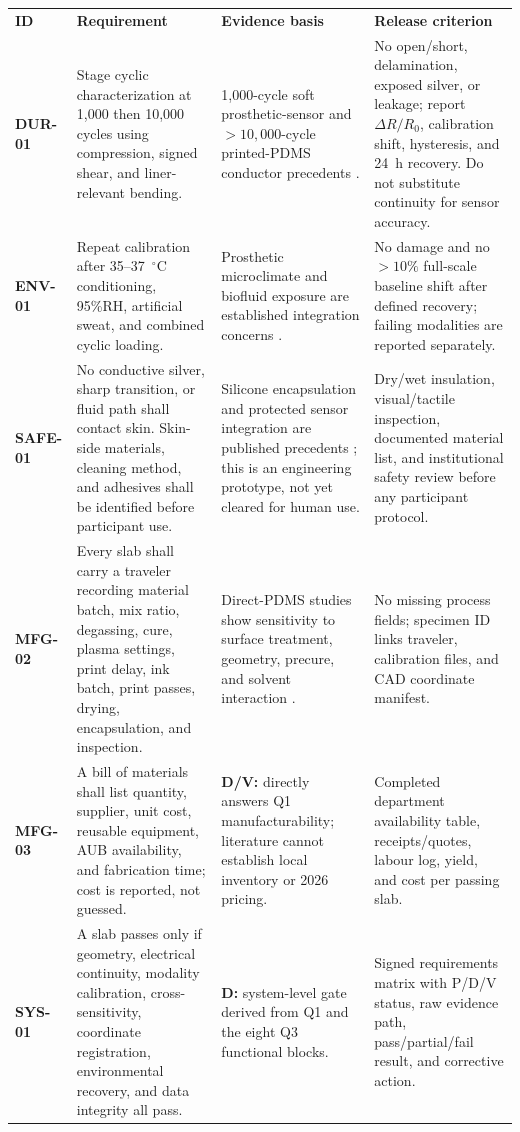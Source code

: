 \vspace{0.25em}
\begingroup
\fontsize{8.0}{9.35}\selectfont
\setlength{\tabcolsep}{3pt}\renewcommand{\arraystretch}{1.06}
\begin{tabularx}{\linewidth}{>{\raggedright\arraybackslash\bfseries\color{AUBRed}}p{1.25cm}Y Y Y}
\color{white}\textbf{ID} & \color{white}\textbf{Requirement} &
\color{white}\textbf{Evidence basis} & \color{white}\textbf{Release criterion} \\
DUR-01 & Stage cyclic characterization at 1,000 then 10,000 cycles using
compression, signed shear, and liner-relevant bending. & 1,000-cycle soft
prosthetic-sensor and $>10{,}000$-cycle printed-PDMS conductor precedents
\cite{q3kwak2020,albrecht2018stretch}. & No open/short, delamination, exposed
silver, or leakage; report $\Delta R/R_0$, calibration shift, hysteresis, and
24~h recovery. Do not substitute continuity for sensor accuracy. \\
ENV-01 & Repeat calibration after 35--37~$^{\circ}$C conditioning, 95\%RH,
artificial sweat, and combined cyclic loading. & Prosthetic microclimate and
biofluid exposure are established integration concerns
\cite{paterno2020,q3kwak2020}. & No damage and no $>10\%$ full-scale baseline
shift after defined recovery; failing modalities are reported separately. \\
SAFE-01 & No conductive silver, sharp transition, or fluid path shall contact
skin. Skin-side materials, cleaning method, and adhesives shall be identified
before participant use. & Silicone encapsulation and protected sensor
integration are published precedents \cite{q3kwak2020,paterno2020}; this is an
engineering prototype, not yet cleared for human use. & Dry/wet insulation,
visual/tactile inspection, documented material list, and institutional safety
review before any participant protocol. \\
MFG-02 & Every slab shall carry a traveler recording material batch, mix ratio,
degassing, cure, plasma settings, print delay, ink batch, print passes, drying,
encapsulation, and inspection. & Direct-PDMS studies show sensitivity to
surface treatment, geometry, precure, and solvent interaction
\cite{albrecht2018stretch,sun2016,q4abukhalaf2019}. & No missing process fields;
specimen ID links traveler, calibration files, and CAD coordinate manifest. \\
MFG-03 & A bill of materials shall list quantity, supplier, unit cost, reusable
equipment, AUB availability, and fabrication time; cost is reported, not
guessed. & \textbf{D/V:} directly answers Q1 manufacturability; literature
cannot establish local inventory or 2026 pricing. & Completed department
availability table, receipts/quotes, labour log, yield, and cost per passing
slab. \\
SYS-01 & A slab passes only if geometry, electrical continuity, modality
calibration, cross-sensitivity, coordinate registration, environmental
recovery, and data integrity all pass. & \textbf{D:} system-level gate derived
from Q1 and the eight Q3 functional blocks. & Signed requirements matrix with
P/D/V status, raw evidence path, pass/partial/fail result, and corrective
action. \\
\end{tabularx}
